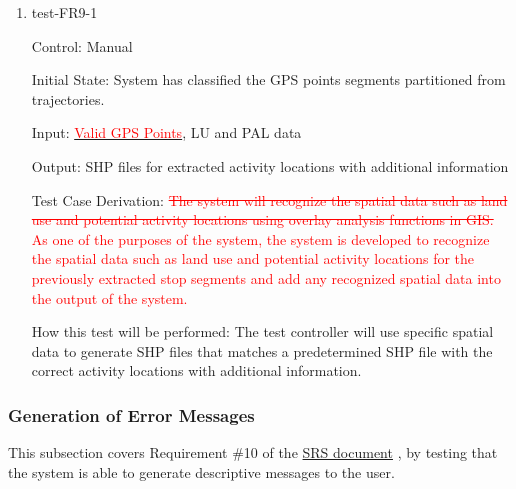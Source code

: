 \documentclass[12pt, titlepage]{article}
\begin{document}
\begin{enumerate}

\item{test-FR9-1\\} \label{test-FR9-1}

Control: Manual 
					
Initial State: System has classified the GPS points segments partitioned from trajectories.
					
Input: \href{https://github.com/paezha/PyERT-BLACK/blob/rev0-test/quarto-example/data/sample-gps/sample-gps-1.csv}{\textcolor{red}{Valid GPS Points}}, LU and PAL data
					
Output: SHP files for extracted activity locations with additional information 

Test Case Derivation: \textcolor{red}{\sout{The system will recognize the spatial data such as land use and potential activity locations using overlay analysis functions in GIS.} As one of the purposes of the system, the system is developed to recognize the spatial data such as land use and potential activity locations for the previously extracted stop segments and add any recognized spatial data into the output of the system.}
					
How this test will be performed: The test controller will use specific spatial data to generate SHP files that matches a predetermined SHP file with the correct activity locations with additional information.

\end{enumerate}

\subsubsection{Generation of Error Messages}

This subsection covers Requirement \#10 of the \href{https://github.com/paezha/PyERT-BLACK/blob/main/docs/SRS/SRS.pdf}{SRS document} \citep{SRS}, by testing that the system is able to generate descriptive messages to the user.
\end{document}
